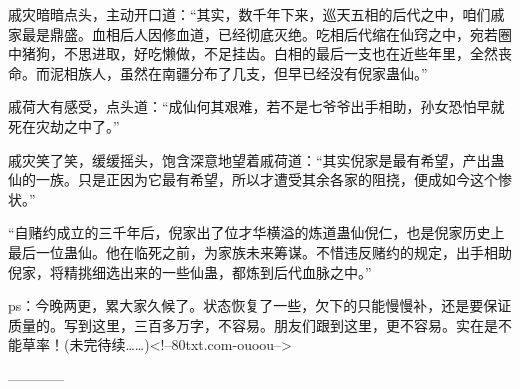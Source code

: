 \begin{this_body}
戚灾暗暗点头，主动开口道：“其实，数千年下来，巡天五相的后代之中，咱们戚家最是鼎盛。血相后人因修血道，已经彻底灭绝。吃相后代缩在仙窍之中，宛若圈中猪狗，不思进取，好吃懒做，不足挂齿。白相的最后一支也在近些年里，全然丧命。而泥相族人，虽然在南疆分布了几支，但早已经没有倪家蛊仙。”

戚荷大有感受，点头道：“成仙何其艰难，若不是七爷爷出手相助，孙女恐怕早就死在灾劫之中了。”

戚灾笑了笑，缓缓摇头，饱含深意地望着戚荷道：“其实倪家是最有希望，产出蛊仙的一族。只是正因为它最有希望，所以才遭受其余各家的阻挠，便成如今这个惨状。”

“自赌约成立的三千年后，倪家出了位才华横溢的炼道蛊仙倪仁，也是倪家历史上最后一位蛊仙。他在临死之前，为家族未来筹谋。不惜违反赌约的规定，出手相助倪家，将精挑细选出来的一些仙蛊，都炼到后代血脉之中。”

ps：今晚两更，累大家久候了。状态恢复了一些，欠下的只能慢慢补，还是要保证质量的。写到这里，三百多万字，不容易。朋友们跟到这里，更不容易。实在是不能草率！(未完待续……)<!--80txt.com-ouoou-->

------------

\end{this_body}

